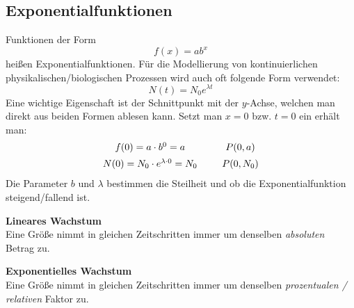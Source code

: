 \subsection{Exponentialfunktionen}

Funktionen der Form
\begin{equation}
    f(x) = a b^x
\end{equation}
heißen Exponentialfunktionen. Für die Modellierung von kontinuierlichen physikalischen/biologischen Prozessen wird auch oft folgende Form verwendet:
\begin{equation}
    N(t) = N_0 e^{\lambda t}
\end{equation}
Eine wichtige Eigenschaft ist der Schnittpunkt mit der $y$-Achse, welchen man direkt aus beiden Formen ablesen kann. Setzt man $x=0$ bzw. $t=0$ ein erhält man:
\begin{equation}
\begin{array}{c@{\;}c@{\;}c}
    f(0) = a \cdot b^0 = a & \qquad & P(0,a) \\[5pt]
    N(0) = N_0 \cdot e^{\lambda \cdot 0} = N_0 & \qquad & P(0,N_0)
\end{array}
\end{equation}
Die Parameter $b$ und $\lambda$ bestimmen die Steilheit und ob die Exponentialfunktion steigend/fallend ist.\\[5pt]
\noindent
\begin{minipage}[t]{0.45\textwidth}
    \textbf{Lineares Wachstum} \\
    Eine Größe nimmt in gleichen Zeitschritten immer um denselben \emph{absoluten} Betrag zu.
\end{minipage}
\hfill
\begin{minipage}[t]{0.45\textwidth}
    \textbf{Exponentielles Wachstum} \\
    Eine Größe nimmt in gleichen Zeitschritten immer um denselben \emph{prozentualen / relativen} Faktor zu.
\end{minipage}
\vspace{20pt}\\
